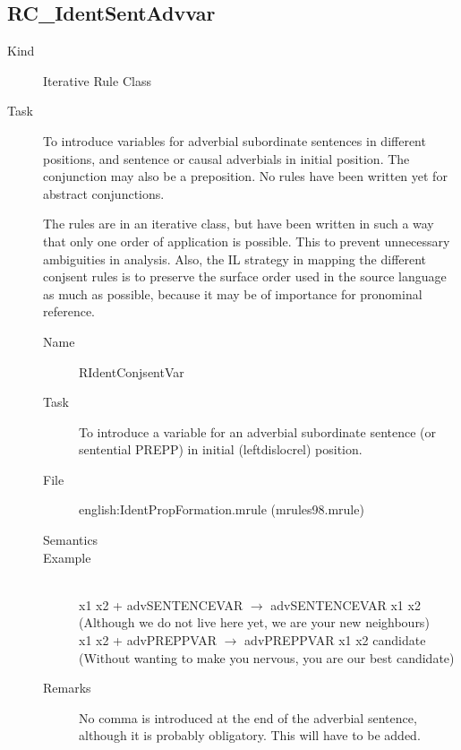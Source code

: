 \subsection{RC\_IdentSentAdvvar}
\begin{description}
\item[Kind] Iterative Rule Class
\item[Task] To introduce variables for adverbial subordinate sentences in 
different positions, and sentence or causal adverbials in initial position. The 
conjunction may also be a preposition. No rules have been written yet for 
abstract conjunctions.

The rules are in an iterative class, but have been written in such a way that 
only one order of application is possible. This to prevent unnecessary 
ambiguities in analysis. Also, the IL strategy in mapping the different 
conjsent rules is to preserve the surface order used in the source language as 
much as possible, because it may be of importance for pronominal reference.

\vspace{1 cm}
\begin{description}
\item[Name] RIdentConjsentVar
\item[Task] To introduce a variable for an adverbial subordinate sentence (or 
sentential PREPP) in initial (leftdislocrel) position.
\item[File] english:IdentPropFormation.mrule (mrules98.mrule)
\item[Semantics]
\item[Example] \mbox{}\\
x1 x2 + advSENTENCEVAR $\rightarrow$ advSENTENCEVAR x1 x2\\
(Although we do not live here yet, we are your new neighbours)\\
x1 x2 + advPREPPVAR $\rightarrow$ advPREPPVAR x1 x2 candidate\\
(Without wanting to make you nervous, you are our best candidate)
\item[Remarks] No comma is introduced at the end of the adverbial sentence, 
although it is probably obligatory. This will have to be added.
\end{description}


\end{description}
